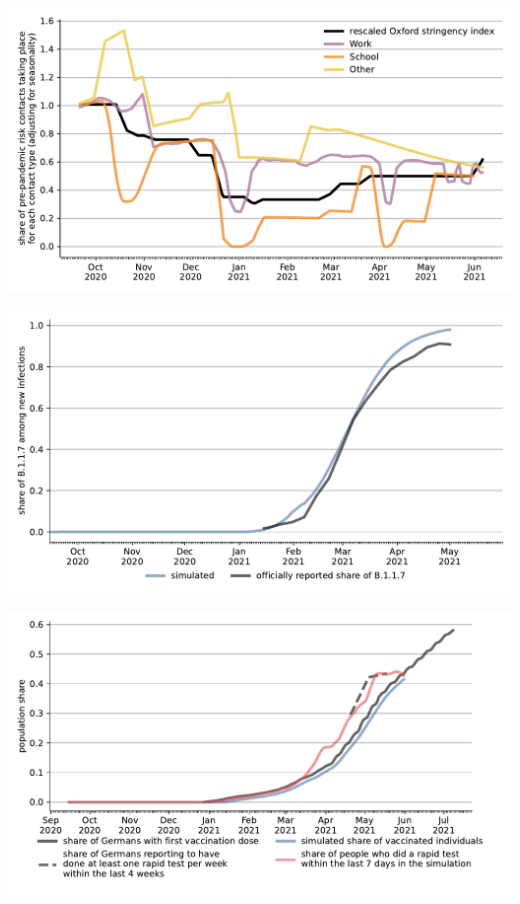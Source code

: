 \documentclass[11pt]{beamer}
\begin{document}
\begin{frame}
    \centering
    \includegraphics[width=\textwidth]{figures/results/figures/data/stringency2_with_seasonality}
\end{frame}


\begin{frame}
    \centering
    \includegraphics[width=\textwidth]{figures/results/figures/scenario_comparisons/combined_fit/full_share_b117}
\end{frame}


\begin{frame}
    \centering
    \includegraphics[width=\textwidth]{figures/results/figures/scenario_comparisons/combined_fit/full_share_rapid_test_in_last_week_and_vaccinated}
\end{frame}
\end{document}
